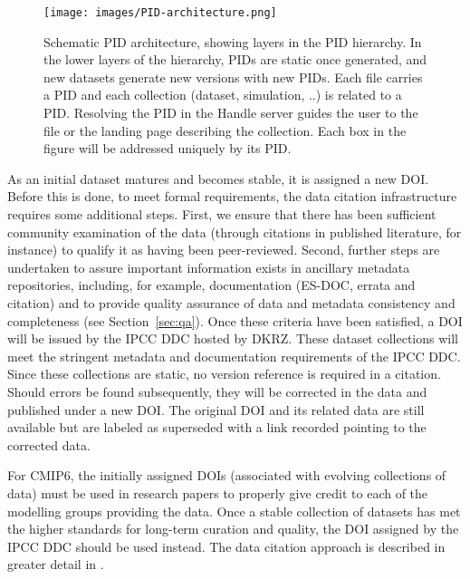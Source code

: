 \documentclass[gmd,manuscript]{copernicus}
\begin{document}
\begin{figure*}
  \begin{center}
    \texttt{[image: images/PID-architecture.png]}
  \end{center}
  \caption{Schematic PID architecture, showing layers in the PID
    hierarchy. In the lower layers of the hierarchy, PIDs are static
    once generated, and new datasets generate new versions with new
    PIDs. Each file carries a PID and each collection (dataset,
    simulation, ..) is related to a PID. Resolving the PID in the
    Handle server guides the user to the file or the landing page
    describing the collection. Each box in the figure will be
    addressed uniquely by its PID.}
  \label{fig:pidarch}
\end{figure*}

As an initial dataset matures and becomes stable, it is assigned a new
DOI. Before this is done, to meet formal requirements, the data citation infrastructure
requires some additional steps.  First, we
ensure that there has been sufficient community examination of the
data
(through citations in published literature, for instance) to qualify
it as having been peer-reviewed. Second, further steps are undertaken
to assure important information exists in ancillary metadata
repositories, including, for example, documentation (ES-DOC, errata
and citation) and to provide quality assurance of data and metadata
consistency and completeness (see Section~\ref{sec:qa}). Once these
criteria have been satisfied, a DOI will be issued by the IPCC DDC
hosted by DKRZ. These dataset collections will meet the stringent
metadata and documentation requirements of the IPCC DDC. Since these
collections are static, no version reference is required in a
citation.
Should errors be found subsequently, they will be corrected in the
data and published under a new DOI. The original DOI and its related
data are still available but are labeled as superseded with a link recorded
pointing to the corrected data.

For CMIP6, the initially assigned DOIs (associated with evolving
collections of data) must be used in research papers to properly give
credit to each of the modelling groups providing the data. Once a
stable collection of datasets has met the higher standards for
long-term curation and quality, the DOI assigned by the IPCC DDC
should be used instead.
The data citation approach is described in greater detail in \cite{ref:stockhauselautenschlager2017}.
\end{document}

